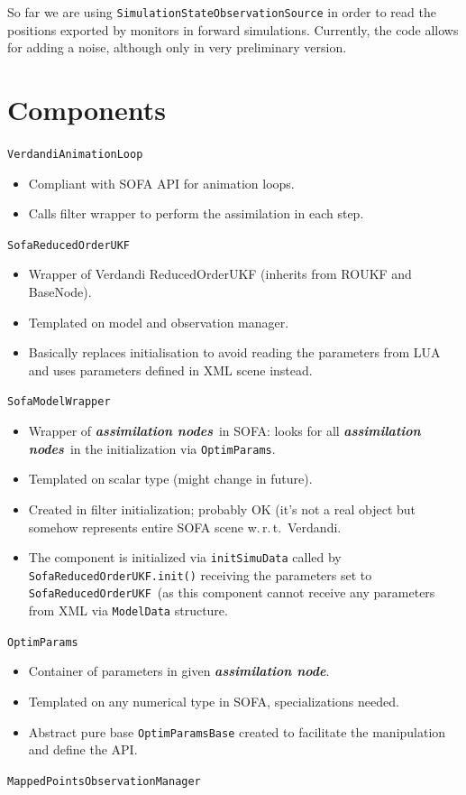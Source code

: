 \documentclass[10pt]{article}
\def\wrt{w.\,r.\,t.}
\def\asn{\textit{\textbf{assimilation node}}}
\def\asns{\textit{\textbf{assimilation nodes}}}
\def\veal{\texttt{VerdandiAnimationLoop}}
\def\sroukf{\texttt{SofaReducedOrderUKF}}
\def\smw{\texttt{SofaModelWrapper}}
\def\opr{\texttt{OptimParams}}
\def\mobs{\texttt{MappedPointsObservationManager}}
\begin{document}
So far we are using \texttt{SimulationStateObservationSource} in order to read the positions exported by monitors in forward simulations. Currently,
the code allows for adding a noise, although 
only in very preliminary version.

\section{Components}
{\large \veal}
\begin{itemize}
\item Compliant with SOFA API for animation loops. 
\item Calls filter wrapper to perform the assimilation in each step.
\end{itemize}
\medskip
{\large \sroukf}
\begin{itemize}
\item Wrapper of Verdandi ReducedOrderUKF (inherits from ROUKF and BaseNode).
\item Templated on model and observation manager.
\item Basically replaces initialisation to avoid reading the parameters from LUA and uses parameters defined in XML scene instead. 
\end{itemize}
\medskip
{\large\smw}
\begin{itemize}
\item Wrapper of \asns\ in SOFA: looks for all \asns\ in the initialization via \opr.
\item Templated on scalar type (might change in future).
\item Created in filter initialization; probably OK (it's not a real object but somehow represents entire SOFA scene \wrt\ Verdandi.
\item The component is initialized via \texttt{initSimuData} called by \sroukf\texttt{.init()} receiving the parameters set to \sroukf\ (as this
component cannot 
receive any parameters from XML via \texttt{ModelData} structure.
\end{itemize}
\medskip
{\large\opr}
\begin{itemize}
\item Container of parameters in given \asn. 
\item Templated on any numerical type in SOFA, specializations needed.
\item Abstract pure base \texttt{OptimParamsBase} created to facilitate the manipulation and define the API.
\end{itemize}
\medskip
{\large\mobs}
\end{document}
